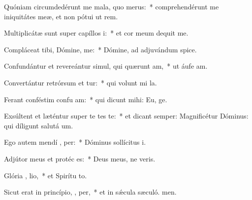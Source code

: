\item Quóniam circumdedérunt me mala, quo   merus:~* comprehendérunt me iniquitátes meæ, et non pótui ut rem.
\item Multiplicátæ sunt super capíllos  i:~* et cor meum dequit me.
\item Compláceat tibi, Dómine,   me:~* Dómine, ad adjuvándum  spice.
\item Confundántur et revereántur simul, qui quærunt  am,~* ut áufe am.
\item Convertántur retrórsum et tur:~* qui volunt mi la.
\item Ferant conféstim confu am:~* qui dicunt mihi: Eu, ge.
\item Exsúltent et læténtur super te  tes te:~* et dicant semper: Magnificétur Dóminus: qui díligunt salutá um.
\item Ego autem mendí ,  per:~* Dóminus sollícitus  i.
\item Adjútor meus et protéc   es:~* Deus meus, ne veris.
\item Glória ,  lio,~* et Spirítu to.
\item Sicut erat in princípio,  ,  per,~* et in sǽcula sæculó. men.
